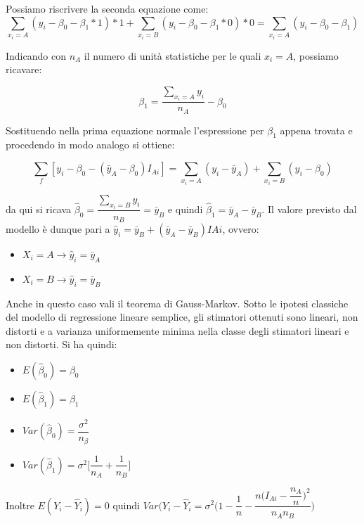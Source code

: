 \documentclass[a4paper]{extarticle}
\begin{document}
Possiamo riscrivere la seconda equazione come:
\begin{equation*}
\sum\limits_{x_i=A} (y_i - \beta_0 - \beta_1 *1)*1 + \sum\limits_{x_i=B} (y_i - \beta_0 - \beta_1 *0)*0 = \sum\limits_{x_i=A} (y_i - \beta_0 - \beta_1 )
\end{equation*}

Indicando con $n_A$ il numero di unità statistiche per le quali $x_i = A$, possiamo ricavare:

\begin{equation*}
\beta_1 = \dfrac{\sum\limits_{x_i = A}y_i}{n_A} - \beta_0
\end{equation*}

Sostituendo nella prima equazione normale l'espressione per $\beta_1$ appena trovata e procedendo in modo analogo si ottiene:

\begin{equation*}
\sum_f [ y_i - \beta_0 - (\bar y_A - \beta_0)I_{Ai}] = \sum\limits_{x_i=A}(y_i - \bar y_A)+ \sum\limits_{x_i=B}(y_i - \beta_0)
\end{equation*}

da qui si ricava $\hat \beta_0 = \dfrac{\sum\limits_{x_i=B}y_i}{n_B} = \bar y_B$  e quindi $\hat \beta_1 = \bar y_A - \bar y_B$. Il valore previsto dal modello è dunque pari a $\hat y_i = \bar y_B + (\bar y_A - \bar y_B)I{Ai}$, ovvero:

\begin{itemize}
\item $X_i = A \rightarrow \hat y_i = \bar y_A$
\item $X_i = B \rightarrow \hat y_i = \bar y_B$
\end{itemize}

Anche in questo caso vali il teorema di Gauss-Markov. Sotto le ipotesi classiche del modello di regressione lineare semplice, gli stimatori ottenuti sono lineari, non distorti e a varianza uniformemente minima nella classe degli stimatori lineari e non distorti. Si ha quindi:

\begin{itemize}
\item $E(\hat \beta_0) = \beta_0$
\item $E(\hat \beta_1) = \beta_1$
\item $Var(\hat \beta_0)= \dfrac{\sigma^2}{n_{\beta}}$
\item $Var(\hat \beta_1) = \sigma^2 \biggr [ \dfrac{1}{n_A} + \dfrac{1}{n_{B}}\biggl]$
\end{itemize}

Inoltre $E(Y_i - \hat Y_i) = 0$ quindi $Var(Y_i - \hat Y_i =  \sigma^2 \Biggr( 1- \dfrac{1}{n} - \dfrac{n \biggr( I_{Ai}-\dfrac{n_A}{n} \biggl)^2}{n_A n_B} \Biggl )$
\end{document}
